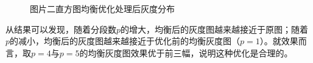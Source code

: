 \documentclass[UTF8]{ctexart}
\begin{document}
\begin{figure}[H]
				\caption{图片二直方图均衡优化处理后灰度分布}
			\end{figure}

			从结果可以发现，随着分段数$p$的增大，均衡后的灰度图越来越接近于原图；随着$p$的减小，均衡后的灰度图越来越接近于优化前的均衡灰度图（$p=1$）。就效果而言，取$p=4$与$p=5$的均衡灰度图效果优于前三幅，说明这种优化是合理的。\newline
\end{document}
